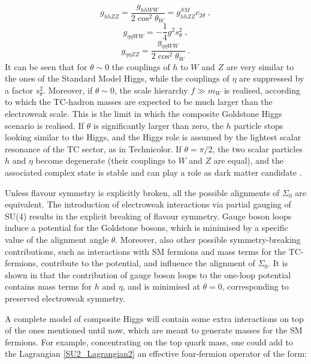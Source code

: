 \begin{equation}
g_{hhZZ} = \frac{g_{hhWW}}{2 \cos^2 \theta_W}  = g_{hhZZ}^{SM} c_{2 \theta} \; ,
\end{equation}
\begin{equation}
g_{\eta \eta WW} = - \frac{1}{4} g^2 s_{\theta}^2 \; ,
\end{equation} 
\begin{equation}
g_{\eta \eta ZZ} = \frac{g_{\eta \eta WW}}{2 \cos^2 \theta_W}  \; .
\end{equation}
%
It can be seen that for $\theta \sim 0$ the couplings of  $h$ to $W$ and $Z$ are very similar to the ones of the Standard Model Higgs, while the couplings of $\eta$ are suppressed by a factor $s_{\theta}^2$. Moreover, if $\theta \sim 0$, the scale hierarchy $f \gg m_W$ is realised,  according to which the TC-hadron masses are expected to be much larger than the electroweak scale. This is the limit in which the composite Goldstone Higgs scenario is realised. If $\theta$ is significantly larger than zero, the $h$ particle stops looking similar to the Higgs, and the Higgs role is assumed by the lightest scalar resonance of the TC sector, as in Technicolor. If $\theta = \pi/2$, the two scalar particles $h$ and $\eta$ become degenerate (their couplings to $W$ and $Z$ are equal), and the associated complex state is stable and can play a role as dark matter candidate \cite{Cacciapaglia:2014uja}.

Unless flavour symmetry is explicitly broken, all the possible alignments of $\Sigma_0$ are equivalent. The introduction of electroweak interactions via partial gauging of SU(4) results in the explicit breaking of flavour symmetry. Gauge boson loops induce a potential for the Goldstone bosons, which is minimised by a specific value of the alignment angle $\theta$. Moreover, also other possible symmetry-breaking contributions, such as interactions with SM fermions and mass terms for the TC-fermions, contribute to the potential, and influence the alignment of $\Sigma_0$. It is shown in \cite{Cacciapaglia:2014uja} that the contribution of gauge boson loops to the one-loop potential contains mass terms for $h$ and $\eta$, and is minimised at $\theta = 0$, corresponding to preserved electroweak symmetry.


A complete model of composite Higgs will contain some extra interactions on top of the ones mentioned until now, which are meant to generate masses for the SM fermions. For example, concentrating on the top quark mass, one could add to the Lagrangian \ref{SU2_Lagrangian2} an effective four-fermion operator of the form:

